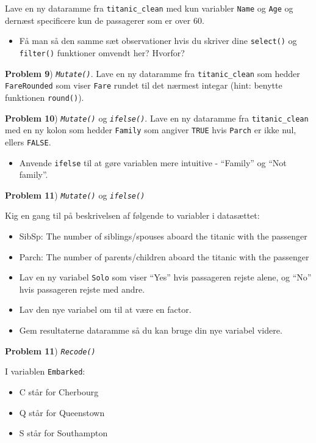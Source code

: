 \documentclass[
]{book}
\providecommand{\tightlist}{%
  \setlength{\itemsep}{0pt}\setlength{\parskip}{0pt}}
\begin{document}
Lave en ny dataramme fra \texttt{titanic\_clean} med kun variabler \texttt{Name} og \texttt{Age} og dernæst specificere kun de passagerer som er over 60.

\begin{itemize}
\tightlist
\item
  Få man så den samme sæt observationer hvis du skriver dine \texttt{select()} og \texttt{filter()} funktioner omvendt her? Hvorfor?
\end{itemize}

\textbf{Problem 9}) \emph{\texttt{Mutate()}}. Lave en ny dataramme fra \texttt{titanic\_clean} som hedder \texttt{FareRounded} som viser \texttt{Fare} rundet til det nærmest integar (hint: benytte funktionen \texttt{round()}).

\textbf{Problem 10}) \emph{\texttt{Mutate()}} og \emph{\texttt{ifelse()}}. Lave en ny dataramme fra \texttt{titanic\_clean} med en ny kolon som hedder \texttt{Family} som angiver \texttt{TRUE} hvis \texttt{Parch} er ikke nul, ellers \texttt{FALSE}.

\begin{itemize}
\tightlist
\item
  Anvende \texttt{ifelse} til at gøre variablen mere intuitive - ``Family'' og ``Not family''.
\end{itemize}

\textbf{Problem 11}) \emph{\texttt{Mutate()}} og \emph{\texttt{ifelse()}}

Kig en gang til på beskrivelsen af følgende to variabler i datasættet:

\begin{itemize}
\item
  SibSp: The number of siblings/spouses aboard the titanic with the passenger
\item
  Parch: The number of parents/children aboard the titanic with the passenger
\item
  Lav en ny variabel \texttt{Solo} som viser ``Yes'' hvis passageren rejste alene, og ``No'' hvis passageren rejste med andre.
\item
  Lav den nye variabel om til at være en factor.
\item
  Gem resultaterne dataramme så du kan bruge din nye variabel videre.
\end{itemize}

\textbf{Problem 11}) \emph{\texttt{Recode()}}

I variablen \texttt{Embarked}:

\begin{itemize}
\tightlist
\item
  C står for Cherbourg
\item
  Q står for Queenstown
\item
  S står for Southampton
\end{itemize}
\end{document}
